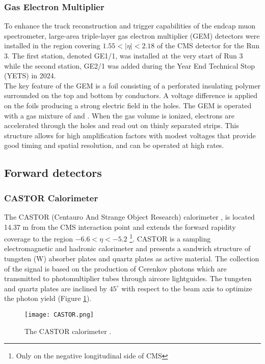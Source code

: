 \subsubsection{\label{subsubsec:exp_CMS_Muon_GEMS}Gas Electron Multiplier}
\noindent To enhance the track reconstruction and trigger capabilities of the endcap muon spectrometer, large-area triple-layer gas electron multiplier (GEM) detectors \cite{SAULI1997531} were installed in the region covering $1.55 < |\eta| < 2.18$ of the CMS detector for the Run 3. The first station, denoted GE1/1, was installed at the very start of Run 3 while the second station, GE2/1 was added during the Year End Technical Stop (YETS) in 2024.  \\
\indent The key feature of the GEM is a foil consisting of a perforated insulating polymer surrounded on the top and bottom by conductors. A voltage difference is applied on the foils producing a strong electric field in the holes. The GEM is operated with a gas mixture of  and . When the gas volume is ionized, electrons are accelerated through the holes and read out on thinly separated strips. This structure allows for high amplification factors with modest voltages that provide good timing and spatial resolution, and can be operated at high rates.

\subsection{\label{sec:exp_CMS_6}Forward detectors}

\subsubsection{\label{subsubsec:exp_CMS_CASTOR}CASTOR Calorimeter}
\noindent The CASTOR (Centauro And Strange Object Research) calorimeter \cite{gunnellini2013castor, roland2010forward, CMS:2020ldm}, is located 14.37 m from the CMS interaction point and extends the forward rapidity coverage to the region $-6.6 < \eta < -5.2$ \footnote{Only on the negative longitudinal side of CMS}. CASTOR is a sampling electromagnetic and hadronic calorimeter and presents a sandwich structure of tungsten (W) absorber plates and quartz plates as active material. The collection of the signal is based on the production of Cerenkov photons which are transmitted to photomultiplier tubes through aircore lightguides. The tungsten and quartz plates are inclined by $45^\circ$ with respect to the beam axis to optimize the photon yield (Figure \ref{fig:CASTOR}).
\begin{figure}[H]
    \centering
    \texttt{[image: CASTOR.png]}
    \caption{The CASTOR calorimeter \cite{roland2010forward}.}
    \label{fig:CASTOR}
\end{figure}
